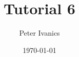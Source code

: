 \documentclass[11]{article}
\begin{document}
	\tableofcontents

	\title{Tutorial 6}
	\author{Peter Ivanics}
	\date{\today}
	\maketitle
	
	
\end{document}
